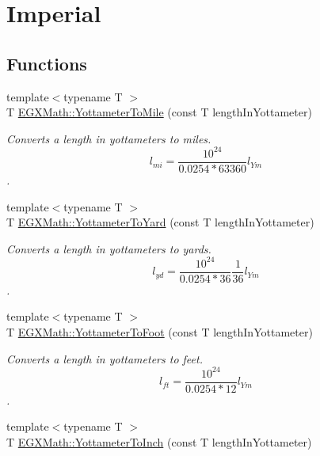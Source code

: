 \hypertarget{group___e_g_x_math-_conversions-_length_conversions-_yottameter-_imperial}{}\section{Imperial}
\label{group___e_g_x_math-_conversions-_length_conversions-_yottameter-_imperial}
\subsection*{Functions}
\begin{DoxyCompactItemize}
\item 
{\footnotesize template$<$typename T $>$ }\\T \mbox{\hyperlink{group___e_g_x_math-_conversions-_length_conversions-_yottameter-_imperial_ga4ca41b9b222f31926417df30e0539b50}{E\+G\+X\+Math\+::\+Yottameter\+To\+Mile}} (const T length\+In\+Yottameter)
\begin{DoxyCompactList}\small\item\em Converts a length in yottameters to miles. \[ l_{mi}=\frac{10^{24}}{0.0254 * 63360} l_{Ym} \]. \end{DoxyCompactList}\item 
{\footnotesize template$<$typename T $>$ }\\T \mbox{\hyperlink{group___e_g_x_math-_conversions-_length_conversions-_yottameter-_imperial_ga87f19dee341e81a7bb72bf4a5134935f}{E\+G\+X\+Math\+::\+Yottameter\+To\+Yard}} (const T length\+In\+Yottameter)
\begin{DoxyCompactList}\small\item\em Converts a length in yottameters to yards. \[ l_{yd}= \frac{10^{24}}{0.0254 * 36} \frac{1}{36} l_{Ym} \]. \end{DoxyCompactList}\item 
{\footnotesize template$<$typename T $>$ }\\T \mbox{\hyperlink{group___e_g_x_math-_conversions-_length_conversions-_yottameter-_imperial_gae693078fe8f9b2ca717732916dcf28d7}{E\+G\+X\+Math\+::\+Yottameter\+To\+Foot}} (const T length\+In\+Yottameter)
\begin{DoxyCompactList}\small\item\em Converts a length in yottameters to feet. \[ l_{ft}= \frac{10^{24}}{0.0254 * 12} l_{Ym} \]. \end{DoxyCompactList}\item 
{\footnotesize template$<$typename T $>$ }\\T \mbox{\hyperlink{group___e_g_x_math-_conversions-_length_conversions-_yottameter-_imperial_ga6de8b1bd4812d6814328cb5d54adf08c}{E\+G\+X\+Math\+::\+Yottameter\+To\+Inch}} (const T length\+In\+Yottameter)

\end{DoxyCompactItemize}
